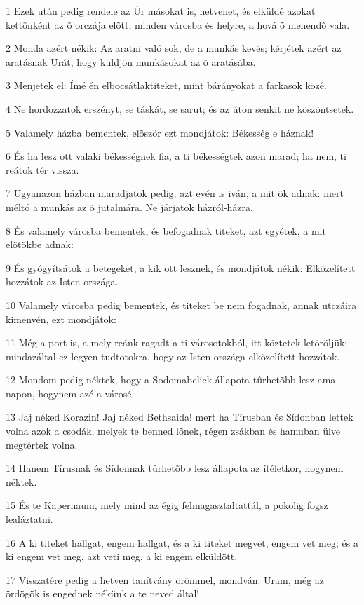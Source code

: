 \par 1 Ezek után pedig rendele az Úr másokat is, hetvenet, és elküldé azokat kettõnként az õ orczája elõtt, minden városba és helyre, a hová õ menendõ vala.
\par 2 Monda azért nékik: Az aratni való sok, de a munkás kevés; kérjétek azért az aratásnak Urát, hogy küldjön munkásokat az õ aratásába.
\par 3 Menjetek el: Ímé én elbocsátlaktiteket, mint bárányokat a farkasok közé.
\par 4 Ne hordozzatok erszényt, se táskát, se sarut; és az úton  senkit ne köszöntsetek.
\par 5 Valamely házba bementek, elõször ezt mondjátok: Békesség e háznak!
\par 6 És ha lesz ott valaki békességnek fia, a ti békességtek azon marad; ha nem, ti reátok tér vissza.
\par 7 Ugyanazon házban maradjatok pedig, azt evén is iván, a mit õk adnak: mert méltó a munkás  az õ jutalmára. Ne járjatok házról-házra.
\par 8 És valamely városba bementek, és befogadnak titeket, azt egyétek, a mit elõtökbe adnak:
\par 9 És gyógyítsátok a betegeket, a kik ott lesznek, és mondjátok nékik: Elközelített hozzátok az Isten országa.
\par 10 Valamely városba pedig bementek, és titeket be nem fogadnak, annak utczáira kimenvén, ezt mondjátok:
\par 11 Még a port is, a mely reánk ragadt a ti városotokból, itt köztetek letöröljük; mindazáltal ez legyen tudtotokra, hogy az Isten országa elközelített hozzátok.
\par 12 Mondom pedig néktek, hogy a Sodomabeliek állapota tûrhetõbb lesz ama napon, hogynem azé a városé.
\par 13 Jaj néked Korazin! Jaj néked Bethsaida! mert ha Tírusban és Sídonban lettek volna azok a csodák, melyek te benned lõnek, régen zsákban és hamuban ülve megtértek volna.
\par 14 Hanem Tírusnak és Sídonnak tûrhetõbb lesz állapota az ítéletkor, hogynem néktek.
\par 15 És te Kapernaum, mely mind az égig felmagasztaltattál, a pokolig fogsz lealáztatni.
\par 16 A ki titeket hallgat, engem hallgat, és a ki titeket megvet, engem vet meg; és a ki engem vet meg, azt veti meg, a ki engem elküldött.
\par 17 Visszatére pedig a hetven tanítvány örömmel, mondván: Uram, még az ördögök is engednek nékünk a te neved által!
